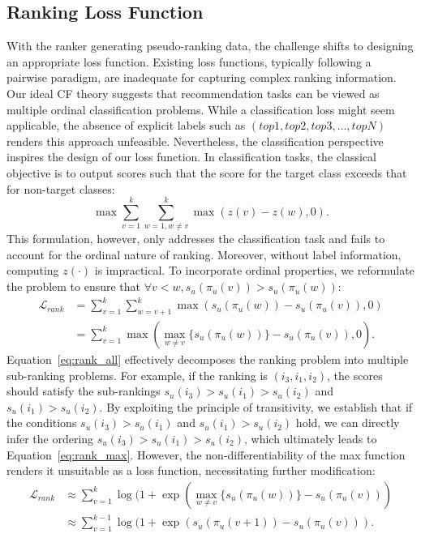 \subsection{Ranking Loss Function}
With the ranker generating pseudo-ranking data, the challenge shifts to designing an appropriate loss function. Existing loss functions, typically following a pairwise paradigm, are inadequate for capturing complex ranking information. Our ideal CF theory suggests that recommendation tasks can be viewed as multiple ordinal classification problems. While a classification loss might seem applicable, the absence of explicit labels such as $(top1, top2, top3, \ldots, topN)$ renders this approach unfeasible. Nevertheless, the classification perspective inspires the design of our loss function. In classification tasks, the classical objective is to output scores such that the score for the target class exceeds that for non-target classes:
\begin{equation}
\max \sum_{v=1}^{k} \sum_{w=1, w\neq v}^{k} \max(z(v) - z(w) , 0).
\end{equation}
This formulation, however, only addresses the classification task and fails to account for the ordinal nature of ranking. Moreover, without label information, computing $z(\cdot)$ is impractical. To incorporate ordinal properties, we reformulate the problem to ensure that $\forall v < w, s_u(\pi_{u}(v)) > s_u(\pi_{u}(w))$:
\begin{align}
\mathcal{L}_{rank} &= \sum_{v=1}^{k} \sum_{w=v+1}^{k} \max(s_u(\pi_{u}(w)) - s_u(\pi_{u}(v)), 0)
\label{eq:rank_all}
\\
&= \sum_{v=1}^{k} \max(\max_{w \neq v}\{s_u(\pi_{u}(w))\} - s_u(\pi_{u}(v)), 0).
\label{eq:rank_max}
\end{align}
Equation~\ref{eq:rank_all} effectively decomposes the ranking problem into multiple sub-ranking problems. For example, if the ranking is $(i_3, i_1, i_2)$, the scores should satisfy the sub-rankings $s_u(i_3) > s_u(i_1) > s_u(i_2)$ and $s_u(i_1) > s_u(i_2)$. By exploiting the principle of transitivity, we establish that if the conditions $s_u(i_3) > s_u(i_1)$ and $s_u(i_1) > s_u(i_2)$ hold, we can directly infer the ordering $s_u(i_3) > s_u(i_1) > s_u(i_2)$, which ultimately leads to Equation~\ref{eq:rank_max}. However, the non-differentiability of the max function renders it unsuitable as a loss function, necessitating further modification:
\begin{align}
\mathcal{L}_{rank} &\approx \sum_{v=1}^{k} \log(1+\exp(\max_{w \neq v}\{s_u(\pi_{u}(w))\} - s_u(\pi_{u}(v))) \\ 
&\approx \sum_{v=1}^{k-1} \log(1+\exp(s_u(\pi_{u}(v+1)) - s_u(\pi_{u}(v))).
\end{align}
